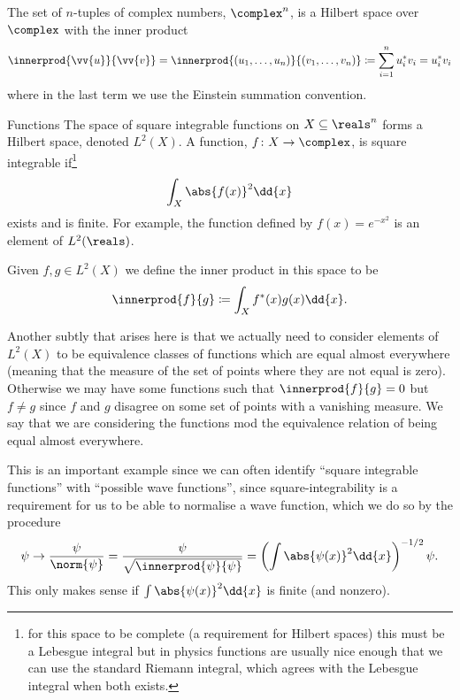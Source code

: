 \begin{exm}{}{}
    The set of \(n\)-tuples of complex numbers, \(\complex^n\), is a Hilbert space over \(\complex\) with the inner product
    \begin{equation}
        \innerprod{\vv{u}}{\vv{v}} = \innerprod{(u_1, \dotsc, u_n)}{(v_1, \dotsc, v_n)} \coloneqq \sum_{i=1}^n u_i^*v_i = u_i^*v_i
    \end{equation}
    where in the last term we use the Einstein summation convention.
\end{exm}

\begin{exm}{Functions}{}
    The space of square integrable functions on \(X \subseteq \reals^n\) forms a Hilbert space, denoted \(L^2(X)\).
    A function, \(f\colon X \to \complex\), is square integrable if\footnote{for this space to be complete (a requirement for Hilbert spaces) this must be a Lebesgue integral but in physics functions are usually nice enough that we can use the standard Riemann integral, which agrees with the Lebesgue integral when both exists.}
    \begin{equation}
        \int_{X} \abs{f(x)}^2 \dd{x}
    \end{equation}
    exists and is finite.
    For example, the function defined by \(f(x) = e^{-x^2}\) is an element of \(L^2(\reals)\).
    
    Given \(f, g \in L^2(X)\) we define the inner product in this space to be
    \begin{equation}
        \innerprod{f}{g} \coloneqq \int_{X} f^*(x)g(x) \dd{x}.
    \end{equation}
    \begin{rmk}
        Another subtly that arises here is that we actually need to consider elements of \(L^2(X)\) to be equivalence classes of functions which are equal almost everywhere (meaning that the measure of the set of points where they are not equal is zero).
        Otherwise we may have some functions such that \(\innerprod{f}{g} = 0\) but \(f \ne g\) since \(f\) and \(g\) disagree on some set of points with a vanishing measure.
        We say that we are considering the functions mod the equivalence relation of being equal almost everywhere.
    \end{rmk}
    
    This is an important example since we can often identify \enquote{square integrable functions} with \enquote{possible wave functions}, since square-integrability is a requirement for us to be able to normalise a wave function, which we do so by the procedure
    \begin{equation}
        \psi \to \frac{\psi}{\norm{\psi}} = \frac{\psi}{\sqrt{\innerprod{\psi}{\psi}}} = \left( \int \abs{\psi(x)}^2 \dd{x} \right)^{-1/2} \psi.
    \end{equation}
    This only makes sense if \(\int \abs{\psi(x)}^2 \dd{x}\) is finite (and nonzero).
\end{exm}

